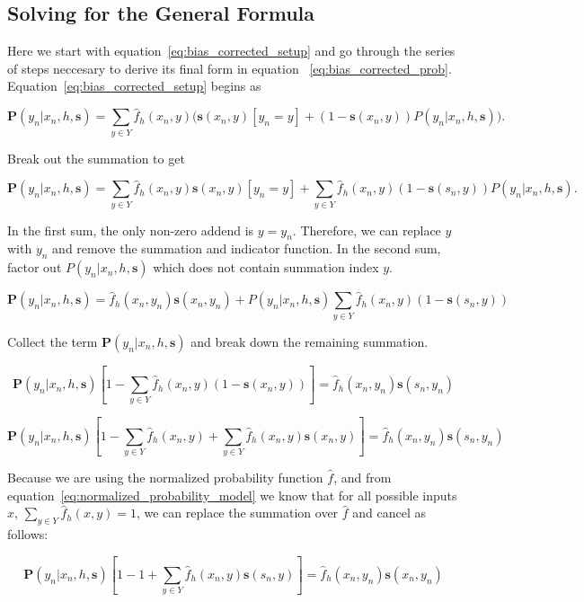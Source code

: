 \documentclass[twoside]{article}
\begin{document}
\begin{appendices}

\section{Solving for the General Formula}
\label{appendix:solving}

Here we start with equation~\eqref{eq:bias_corrected_setup} and go through the series of steps neccesary to derive its final form in equation ~\eqref{eq:bias_corrected_prob}. Equation~\eqref{eq:bias_corrected_setup} begins as

\[\mathbf{P}(y_n|x_n,h,\mathbf{s})=\sum_{y \in Y}\hat{f}_h(x_n,y)\big(\mathbf{s}(x_n,y)\left [y_n = y\right ] + (1-\mathbf{s}(x_n,y))P(y_n|x_n,h,\mathbf{s})\big).\]

Break out the summation to get

\[\mathbf{P}(y_n|x_n,h,\mathbf{s})=\sum_{y \in Y}\hat{f}_h(x_n,y)\mathbf{s}(x_n,y)\left [y_n = y\right ] +\sum_{y \in Y}\hat{f}_h(x_n,y)(1-\mathbf{s}(s_n,y))P(y_n|x_n,h,\mathbf{s}).\]

In the first sum, the only non-zero addend is \(y = y_n\). Therefore, we can replace \(y\) with \(y_n\) and remove the summation and indicator function. In the second sum, factor out \(P(y_n|x_n,h,\mathbf{s})\) which does not contain summation index \(y\).

\[\mathbf{P}(y_n|x_n,h,\mathbf{s})=\hat{f}_h(x_n,y_n)\mathbf{s}(x_n,y_n) +P(y_n|x_n,h,\mathbf{s})\sum_{y \in Y}\hat{f}_h(x_n,y)(1-\mathbf{s}(s_n,y))\]

Collect the term \(\mathbf{P}(y_n|x_n,h,\mathbf{s})\) and break down the remaining summation.

\[\mathbf{P}(y_n|x_n,h,\mathbf{s})\left [ 1 - \sum_{y \in Y}\hat{f}_h(x_n,y)(1-\mathbf{s}(x_n,y)) \right ]=\hat{f}_h(x_n,y_n)\mathbf{s}(s_n,y_n) \]

\[\mathbf{P}(y_n|x_n,h,\mathbf{s})\left [ 1 - \sum_{y \in Y}\hat{f}_h(x_n,y)+\sum_{y \in Y}\hat{f}_h(x_n,y)\mathbf{s}(x_n,y) \right ]=\hat{f}_h(x_n,y_n)\mathbf{s}(s_n,y_n) \]

Because we are using the normalized probability function \(\hat{f}\), and from equation~\eqref{eq:normalized_probability_model} we know that for all possible inputs \(x\), \(\sum_{y \in Y} \hat{f}_h(x, y) = 1\), we can replace the summation over \(\hat{f}\) and cancel as follows:

\[\mathbf{P}(y_n|x_n,h,\mathbf{s})\left [ 1 - 1+\sum_{y \in Y}\hat{f}_h(x_n,y)\mathbf{s}(s_n,y) \right ]=\hat{f}_h(x_n,y_n)\mathbf{s}(x_n,y_n) \]


\end{appendices}
\end{document}
